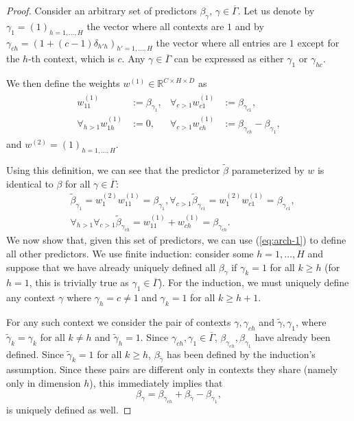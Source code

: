 \documentclass{article}
\theoremstyle{plain}
\theoremstyle{definition}
\theoremstyle{remark}
\begin{document}
\begin{proof}
Consider an arbitrary set of predictors $\beta_{\gamma}$, $\gamma\in\overline{\Gamma}$.
Let us denote by $\gamma_1=(1)_{h=1,\dotsc,H}$ the vector where all contexts are $1$ and by $\gamma_{ch}=(1+(c-1)\delta_{h'h})_{h'=1,\dotsc,H}$ the vector where all entries are $1$ except for the $h$-th context, which is $c$. Any $\gamma\in\overline{\Gamma}$ can be expressed as either $\gamma_1$ or $\gamma_{hc}$.

We then define the weights $w^{(1)}\in\mathbb{R}^{C\times H\times D}$ as
\begin{align}
\begin{aligned}
    w^{(1)}_{11}&:=\beta_{\gamma_1},&\forall_{c>1}w^{(1)}_{c1}&:=\beta_{\gamma_{c1}},\\
    \forall_{h>1}w^{(1)}_{1h}&:=0,&
    \forall_{c>1}w^{(1)}_{ch}&:=\beta_{\gamma_{ch}}-\beta_{\gamma_1},
\end{aligned}
\end{align}
and $w^{(2)}=(1)_{h=1,\dotsc,H}$.

Using this definition, we can see that the predictor $\tilde{\beta}$ parameterized by $w$ is identical to $\beta$ for all $\gamma\in\overline{\Gamma}$:
\begin{align*}
    &\tilde{\beta}_{\gamma_1}=w^{(2)}_1w^{(1)}_{11}=\beta_{\gamma_1},
    \forall_{c>1}\tilde{\beta}_{\gamma_{c1}}=w^{(2)}_1w^{(1)}_{c1}=\beta_{\gamma_{c1}},\\
    &\forall_{h>1}\forall_{c>1}\tilde{\beta}_{\gamma_{ch}}=w_{11}^{(1)}+w_{ch}^{(1)}=\beta_{\gamma_{ch}}.
\end{align*}
We now show that, given this set of predictors, we can use (\ref{eq:arch-1}) to define all other predictors.
We use finite induction: consider some $h=1,\dotsc,H$ and suppose that we have already uniquely defined all $\beta_{\gamma}$ if $\gamma_k=1$ for all $k\geq h$ (for $h=1$, this is trivially true as $\gamma_1\in\overline{\Gamma}$).
For the induction, we must uniquely define any context $\gamma$ where $\gamma_h=c\neq 1$ and $\gamma_k=1$ for all $k\geq h+1$.

For any such context we consider the pair of contexts $\gamma,\gamma_{ch}$ and $\tilde{\gamma},\gamma_1$, where $\tilde{\gamma}_k=\gamma_k$ for all $k\neq h$ and $\tilde{\gamma}_h=1$. Since $\gamma_{ch},\gamma_1\in\overline{\Gamma}$, $\beta_{\gamma_{ch}},\beta_{\gamma_1}$ have already been defined. Since $\tilde{\gamma}_k=1$ for all $k\geq h$, $\beta_{\tilde{\gamma}}$ has been defined by the induction's assumption. Since these pairs are different only in contexts they share (namely only in dimension $h$), this immediately implies that
\begin{equation}
    \beta_{\gamma}=\beta_{\gamma_{ch}}+\beta_{\tilde{\gamma}}-\beta_{\gamma_1},
\end{equation}
is uniquely defined as well.
\end{proof}
\end{document}
